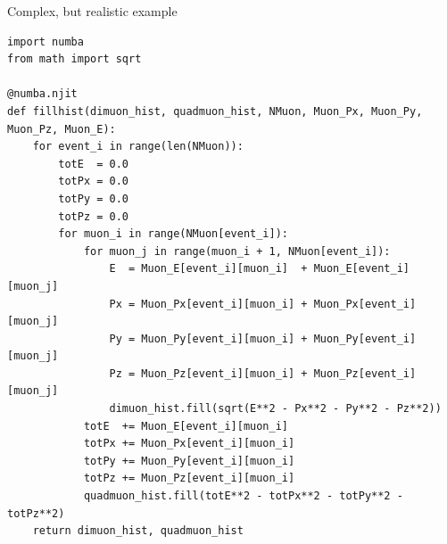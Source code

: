 \documentclass[aspectratio=169]{beamer}
\begin{document}
\begin{frame}[fragile]{Complex, but realistic example}
\vspace{0.2 cm}
\scriptsize
\begin{verbatim}
import numba
from math import sqrt

@numba.njit
def fillhist(dimuon_hist, quadmuon_hist, NMuon, Muon_Px, Muon_Py, Muon_Pz, Muon_E):
    for event_i in range(len(NMuon)):
        totE  = 0.0
        totPx = 0.0
        totPy = 0.0
        totPz = 0.0
        for muon_i in range(NMuon[event_i]):
            for muon_j in range(muon_i + 1, NMuon[event_i]):
                E  = Muon_E[event_i][muon_i]  + Muon_E[event_i][muon_j]
                Px = Muon_Px[event_i][muon_i] + Muon_Px[event_i][muon_j]
                Py = Muon_Py[event_i][muon_i] + Muon_Py[event_i][muon_j]
                Pz = Muon_Pz[event_i][muon_i] + Muon_Pz[event_i][muon_j]
                dimuon_hist.fill(sqrt(E**2 - Px**2 - Py**2 - Pz**2))
            totE  += Muon_E[event_i][muon_i]
            totPx += Muon_Px[event_i][muon_i]
            totPy += Muon_Py[event_i][muon_i]
            totPz += Muon_Pz[event_i][muon_i]
            quadmuon_hist.fill(totE**2 - totPx**2 - totPy**2 - totPz**2)
    return dimuon_hist, quadmuon_hist
\end{verbatim}
\end{frame}
\end{document}
